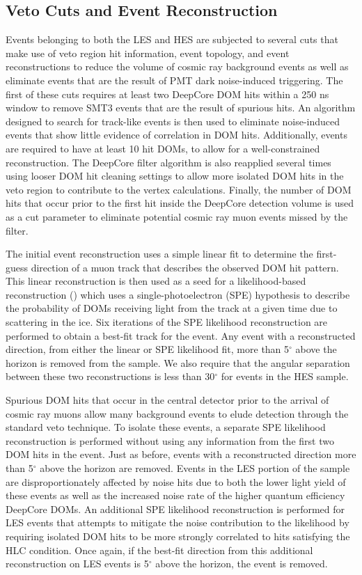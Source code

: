 \documentclass[manuscript]{aastex}
\begin{document}
\subsection{Veto Cuts and Event Reconstruction}
Events belonging to both the LES and HES are subjected to several cuts that make use of veto region hit information, event topology, and event reconstructions to reduce the volume of cosmic ray background events as well as eliminate events that are the result of PMT dark noise-induced triggering. The first of these cuts requires at least two DeepCore DOM hits within a 250 ns window to remove SMT3 events that are the result of spurious hits. An algorithm designed to search for track-like events is then used to eliminate noise-induced events that show little evidence of correlation in DOM hits. Additionally, events are required to have at least 10 hit DOMs, to allow for a well-constrained reconstruction. The DeepCore filter algorithm is also reapplied several times using looser DOM hit cleaning settings to allow more isolated DOM hits in the veto region to contribute to the vertex calculations. Finally, the number of DOM hits that occur prior to the first hit inside the DeepCore detection volume is used as a cut parameter to eliminate potential cosmic ray muon events missed by the filter.

The initial event reconstruction uses a simple linear fit \citep{2014NIMPA.736..143A} to determine the first-guess direction of a muon track that describes the observed DOM hit pattern. This linear reconstruction is then used as a seed for a likelihood-based reconstruction (\cite{2004NIMPA.524..169A}) which uses a single-photoelectron (SPE) hypothesis to describe the probability of DOMs receiving light from the track at a given time due to scattering in the ice. Six iterations of the SPE likelihood reconstruction are performed to obtain a best-fit track for the event. Any event with a reconstructed direction, from either the linear or SPE likelihood fit, more than 5$^{\circ}$ above the horizon is removed from the sample. We also require that the angular separation between these two reconstructions is less than 30$^{\circ}$ for events in the HES sample.

Spurious DOM hits that occur in the central detector prior to the arrival of cosmic ray muons allow many background events to elude detection through the standard veto technique. To isolate these events, a separate SPE likelihood reconstruction is performed without using any information from the first two DOM hits in the event. Just as before, events with a reconstructed direction more than 5$^{\circ}$ above the horizon are removed. Events in the LES portion of the sample are disproportionately affected by noise hits due to both the lower light yield of these events as well as the increased noise rate of the higher quantum efficiency DeepCore DOMs. An additional SPE likelihood reconstruction is performed for LES events that attempts to mitigate the noise contribution to the likelihood by requiring isolated DOM hits to be more strongly correlated to hits satisfying the HLC condition. Once again, if the best-fit direction from this additional reconstruction on LES events is 5$^{\circ}$ above the horizon, the event is removed.
\end{document}
